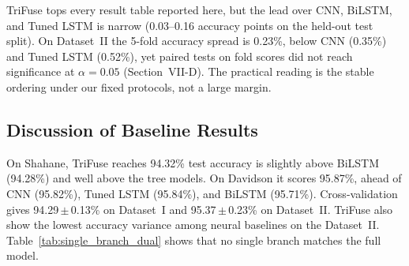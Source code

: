 \begin{table}[!t]
\caption{Stratified 5-Fold Cross-Validation Results (mean\,$\pm$\,std)}
\label{tab:kfold_dual}
\centering
{}
\end{table}

TriFuse tops every result table reported here, but the lead over CNN, BiLSTM, and Tuned LSTM is narrow (0.03--0.16 accuracy points on the held-out test split). On Dataset~II the 5-fold accuracy spread is 0.23\%, below CNN (0.35\%) and Tuned LSTM (0.52\%), yet paired tests on fold scores did not reach significance at $\alpha=0.05$ (Section~VII-D). The practical reading is the stable ordering under our fixed protocols, not a large margin.

\subsection{Discussion of Baseline Results}

On Shahane, TriFuse reaches 94.32\% test accuracy is slightly above BiLSTM (94.28\%) and well above the tree models. On Davidson it scores 95.87\%, ahead of CNN (95.82\%), Tuned LSTM (95.84\%), and BiLSTM (95.71\%). Cross-validation gives 94.29\,$\pm$\,0.13\% on Dataset~I and 95.37\,$\pm$\,0.23\% on Dataset~II. TriFuse also show the lowest accuracy variance among neural baselines on the Dataset~II. Table~\ref{tab:single_branch_dual} shows that no single branch matches the full model.



